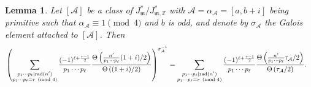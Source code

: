 \documentclass[11pt, reqno]{amsart}
\theoremstyle{plain}
\newtheorem{lemma}[theorem]{Lemma}
\theoremstyle{definition}
\numberwithin{equation}{section}
\begin{document}
\begin{lemma}\label{thetathetagalois}
    Let $[\mathcal{A}]$ be a class  of $J_{\mathfrak{m}}^{*}/J_{\mathfrak{m},\mathbb{Z}}^{*}$ with $\mathcal{A}=\alpha_{\mathcal{A}}=[a,b+i]$ being primitive such that $\alpha_{\mathcal{A}}\equiv1\pmod{4}$ and $b$ is odd, and denote by $\sigma_{\mathcal{A}}$ the Galois element attached to $[\mathcal{A}]$. Then
    \begin{align*}
         &\left(\sum_{\substack{p_{1}\cdots p_{\ell}|{\rm rad}(n')\\ p_{1}\cdots p_{\ell}\equiv r\pmod{4}}}\frac{(-1)^{\ell+\frac{r-1}{2}}}{p_{1}\cdots p_{\ell}}\frac{\Theta\left(\frac{n'}{p_{1}\cdots p_{\ell}}(1+i)/2\right)}{\Theta\left((1+i)/2\right)}\right)^{\sigma_{\mathcal{A}}^{-1}}
         =\sum_{\substack{p_{1}\cdots p_{\ell}|{\rm rad}(n')\\ p_{1}\cdots p_{\ell}\equiv r\pmod{4}}}\frac{(-1)^{\ell+\frac{r-1}{2}}}{p_{1}\cdots p_{\ell}}\frac{\Theta\left(\frac{n'}{p_{1}\cdots p_{\ell}}\tau_{\mathcal{A}}/2\right)}{\Theta\left(\tau_{\mathcal{A}}/2\right)}.
    \end{align*}


\end{lemma}
\end{document}
